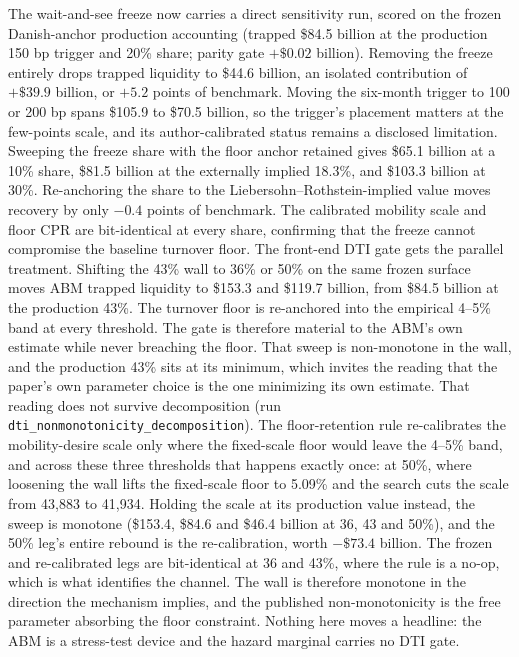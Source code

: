 \documentclass[12pt]{article}
\begin{document}
The wait-and-see freeze now carries a direct sensitivity run, scored on the frozen Danish-anchor production accounting (trapped \$84.5 billion at the production 150 bp trigger and 20\% share; parity gate $+\$0.02$ billion). Removing the freeze entirely drops trapped liquidity to \$44.6 billion, an isolated contribution of $+\$39.9$ billion, or $+5.2$ points of benchmark. Moving the six-month trigger to 100 or 200 bp spans \$105.9 to \$70.5 billion, so the trigger's placement matters at the few-points scale, and its author-calibrated status remains a disclosed limitation. Sweeping the freeze share with the floor anchor retained gives \$65.1 billion at a 10\% share, \$81.5 billion at the externally implied 18.3\%, and \$103.3 billion at 30\%. Re-anchoring the share to the Liebersohn--Rothstein-implied value moves recovery by only $-0.4$ points of benchmark. The calibrated mobility scale and floor CPR are bit-identical at every share, confirming that the freeze cannot compromise the baseline turnover floor. The front-end DTI gate gets the parallel treatment. Shifting the 43\% wall to 36\% or 50\% on the same frozen surface moves ABM trapped liquidity to \$153.3 and \$119.7 billion, from \$84.5 billion at the production 43\%. The turnover floor is re-anchored into the empirical 4--5\% band at every threshold. The gate is therefore material to the ABM's own estimate while never breaching the floor. That sweep is non-monotone in the wall, and the production 43\% sits at its minimum, which invites the reading that the paper's own parameter choice is the one minimizing its own estimate. That reading does not survive decomposition (run \texttt{dti\_nonmonotonicity\_decomposition}). The floor-retention rule re-calibrates the mobility-desire scale only where the fixed-scale floor would leave the 4--5\% band, and across these three thresholds that happens exactly once: at 50\%, where loosening the wall lifts the fixed-scale floor to 5.09\% and the search cuts the scale from 43{,}883 to 41{,}934. Holding the scale at its production value instead, the sweep is monotone (\$153.4, \$84.6 and \$46.4 billion at 36, 43 and 50\%), and the 50\% leg's entire rebound is the re-calibration, worth $-\$73.4$ billion. The frozen and re-calibrated legs are bit-identical at 36 and 43\%, where the rule is a no-op, which is what identifies the channel. The wall is therefore monotone in the direction the mechanism implies, and the published non-monotonicity is the free parameter absorbing the floor constraint. Nothing here moves a headline: the ABM is a stress-test device and the hazard marginal carries no DTI gate.
\end{document}
